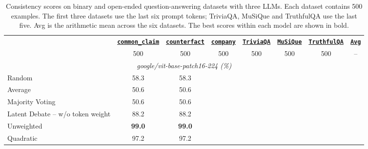 \begin{table}[tp]
    \centering
    \tiny
    \setlength{\tabcolsep}{2.2mm}
    \begin{threeparttable}
        \begin{tabular}{lccccccc}
            \toprule
            & \textbf{\underline{\texttt{common\_claim}}} & \textbf{\underline{\texttt{counterfact}}} & \textbf{\underline{\texttt{company}}} & \textbf{\underline{\texttt{TriviaQA}}} & \textbf{\underline{\texttt{MuSiQue}}} & \textbf{\underline{\texttt{TruthfulQA}}} & \textbf{\underline{\texttt{Avg}}} \\
            & 500 & 500 & 500 & 500 & 500 & 500 & -- \\
            \midrule
            \multicolumn{8}{c}{\textit{google/vit-base-patch16-224 (\%)}} \\
            \midrule
            Random & 58.3 & 58.3 \\
            Average & 50.6 & 50.6 \\
            Majority Voting & 50.6 & 50.6 \\
            Latent Debate -- w/o token weight & 88.2 & 88.2 \\
            Unweighted & \textbf{99.0} & \textbf{99.0} \\
            Quadratic & 97.2 & 97.2 \\
            \bottomrule
        \end{tabular}
        \caption{Consistency scores on binary and open-ended question-answering datasets with three LLMs. Each dataset contains 500 examples. The first three datasets use the last six prompt tokens; TriviaQA, MuSiQue and TruthfulQA use the last five. Avg is the arithmetic mean across the six datasets. The best scores within each model are shown in bold.}
        \label{tab:correlation}
    \end{threeparttable}
    \vspace{-10pt}
\end{table}
